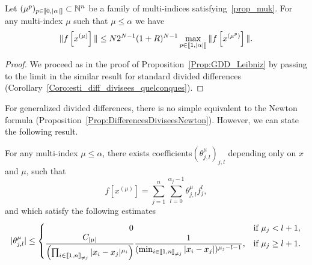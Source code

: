 \documentclass[10pt]{amsart}
\theoremstyle{definition}\newtheorem{defi}[theo]{Definition}\newtheorem{rema}[theo]{Remark}\newtheorem{exam}[theo]{Example}\newtheorem{exem}[theo]{Example}\newtheorem{nota}[theo]{Notation}
\newcommand{\llbracket}{\mathopen{[\mkern -2.7mu[}}
\newcommand{\rrbracket}{\mathclose{]\mkern -2.7mu]}}
\newcommand{\inter}[2]{\llbracket #1,#2 \rrbracket}
\newcommand{\interexclu}[3]{\llbracket #1,#2\rrbracket_{\neq #3}}
\newcommand{\N}{\mathbb{N}}
\begin{document}
\begin{prop}\label{Prop:Diagonale_GDD}
Let $(\mu^p)_{p\in \inter{0}{|\alpha|}} \subset \N^n $ be a family of multi-indices satisfying~\eqref{prop_muk}. For any multi-index $\mu$ such that $\mu\leq \alpha$ we have
\[
\| f\left[x^{(\mu)}\right] \| \leq N 2^{N-1} (1+R)^{N-1} \max_{p\in \inter{1}{|\alpha|}} \|f\left[x^{(\mu^p)}\right]\|.
\]
\end{prop}

\begin{proof}
We proceed as in the proof of Proposition~\ref{Prop:GDD_Leibniz} by passing to the limit in the similar result for standard divided differences (Corollary~\ref{Coro:esti_diff_divisees_quelconques}).
\end{proof}

For generalized divided differences, there is no simple equivalent to the Newton formula (Proposition~\ref{Prop:DifferencesDiviseesNewton}). However, we can state the following result.

\begin{prop}\label{Prop:NewtonGDD}
For any multi-index $\mu\leq \alpha$, there exists coefficients\linebreak$(\theta^\mu_{j,l})_{j,l}$ depending only on $x$ and $\mu$, such that
\[
f[x^{(\mu)}] = \sum_{j=1}^n \sum_{l=0}^{\alpha_j-1} \theta^\mu_{j,l} f_j^l,
\]
and which satisfy the following estimates
\[
|\theta^\mu_{j,l}| \leq
\begin{cases}
\mkern180mu 0 & \text{if }\mu_j<l+1,\\
\displaystyle \frac{C_{|\mu|}}{\left(\prod_{i\in\interexclu{1}{n}{j}} |x_i-x_j|^{\mu_i}\right)} \frac{1}{(\min_{i\in\interexclu{1}{n}{j}} |x_i-x_j|)^{\mu_j-l-1}}, & \text{if }\mu_j\geq l+1.
\end{cases}
\]
\end{prop}
\end{document}
